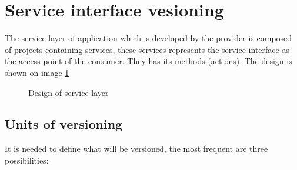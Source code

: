 \section{Service interface vesioning}
\label{sec:interfaceversioning}

The service layer of application which is developed by the provider is composed of projects containing services, these services represents the service interface as the access point of the consumer. They has its methods (actions). The design is shown on image \ref{fig:service-layer-design}

\begin{figure}[htp] 
\caption{Design of service layer}
\label{fig:service-layer-design}
\end{figure} 


\bigskip 


\subsection{Units of versioning}
It is needed to define what will be versioned, the most frequent are three possibilities:

